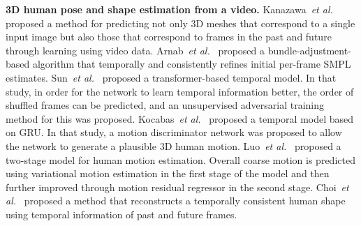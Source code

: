\documentclass[10pt,twocolumn,letterpaper]{article}
\begin{document}
\textbf{3D human pose and shape estimation from a video.} Kanazawa~\textit{et al.}~\cite{kanazawa2019learning} proposed a method for predicting not only 3D meshes that correspond to a single input image but also those that correspond to frames in the past and future through learning using video data. Arnab~\textit{et al.}~\cite{arnab2019exploiting} proposed a bundle-adjustment-based algorithm that temporally and consistently refines initial per-frame SMPL estimates. Sun~\textit{et al.}~\cite{sun2019dsd-satn} proposed a transformer-based temporal model. In that study, in order for the network to learn temporal information better, the order of shuffled frames can be predicted, and an unsupervised adversarial training method for this was proposed. Kocabas~\textit{et al.}~\cite{kocabas2020vibe} proposed a temporal model based on GRU. In that study, a motion discriminator network was proposed to allow the network to generate a plausible 3D human motion. Luo~\textit{et al.}~\cite{Luo_2020_ACCV} proposed a two-stage model for human motion estimation. Overall coarse motion is predicted using variational motion estimation in the first stage of the model and then further improved through motion residual regressor in the second stage. Choi~\textit{et al.}~\cite{choi2021beyond} proposed a method that reconstructs a temporally consistent human shape using temporal information of past and future frames.
\end{document}
